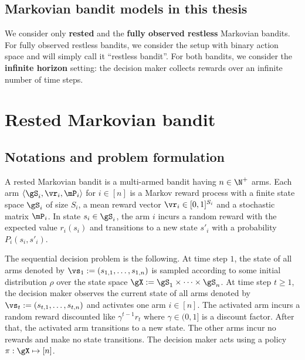 \subsection*{Markovian bandit models in this thesis}

We consider only \textbf{rested} and the \textbf{fully observed restless} Markovian bandits.
For fully observed restless bandits, we consider the setup with binary action space and will simply call it ``restless bandit''.
For both bandits, we consider the \textbf{infinite horizon} setting: the decision maker collects rewards over an infinite number of time steps.

\section{Rested Markovian bandit}
\label{ch:mb:sec:rested}


\subsection{Notations and problem formulation}
\label{ssec:rested_formul}

A rested Markovian bandit is a multi-armed bandit having $n\in\N^+$ arms.
Each arm $\langle\gS_i, \vr_i, \mP_i\rangle$ for $i\in[n]$ is a Markov reward process with a finite state space $\gS_i$ of size $S_i$, a mean reward vector $\vr_i\in[0,1]^{S_i}$ and a stochastic matrix $\mP_i$.
In state $s_i\in\gS_i$, the arm $i$ incurs a random reward with the expected value $r_i(s_i)$ and transitions to a new state $s'_i$ with a probability $P_i(s_i,s'_i)$.

The sequential decision problem is the following.
At time step $1$, the state of all arms denoted by $\vs_1:=(s_{1,1},\dots,s_{1,n})$ is sampled according to some initial distribution $\rho$ over the state space $\gX:=\gS_1\times\dots\times\gS_n$.
At time step $t\ge1$, the decision maker observes the current state of all arms denoted by $\vs_t:=(s_{t,1},\dots,s_{t,n})$ and activates one arm $i\in[n]$.
The activated arm incurs a random reward discounted like $\gamma^{t-1}r_t$ where $\gamma\in(0,1]$ is a discount factor.
After that, the activated arm transitions to a new state. %
The other arms incur no rewards and make no state transitions.
The decision maker acts using a policy $\pi:\gX\mapsto[n]$. 

